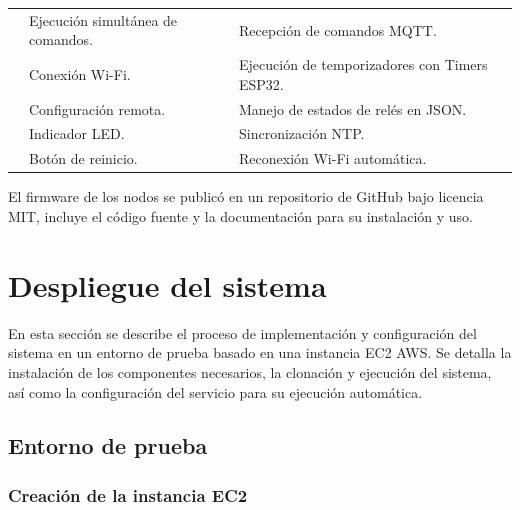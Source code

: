 \begin{table}[H]
\begin{tabular}{p{1.5cm}p{5.4cm}p{5.5cm}}
                                                          & Ejecución simultánea de comandos.                                              & Recepción de comandos MQTT.                     \\
                                                          & Conexión Wi-Fi.                                                                & Ejecución de temporizadores con Timers ESP32.   \\
                                                          & Configuración remota.                                                          & Manejo de estados de relés en JSON.             \\
                                                          & Indicador LED.                                                                 & Sincronización NTP.                             \\
                                                          & Botón de reinicio.                                                             & Reconexión Wi-Fi automática.                    \\
        \bottomrule
        \hline
    \end{tabular}
    \label{tab:nodos_iot}
\end{table}

El firmware de los nodos se publicó en un repositorio de GitHub
\cite{GithubFirmware} bajo licencia MIT, incluye el código fuente y la
documentación para su instalación y uso.

\section{Despliegue del sistema}

En esta sección se describe el proceso de implementación y configuración del
sistema en un entorno de prueba basado en una instancia EC2 AWS. Se detalla la
instalación de los componentes necesarios, la clonación y ejecución del
sistema, así como la configuración del servicio para su ejecución automática.

\subsection{Entorno de prueba}

\subsubsection{Creación de la instancia EC2}

